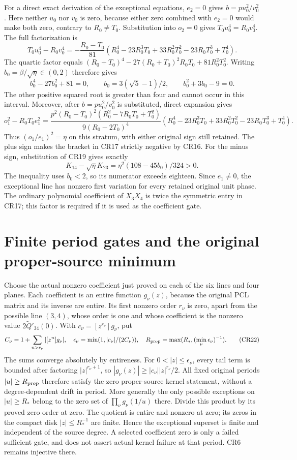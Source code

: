 \documentclass[11pt]{article}
\begin{document}
For a direct exact derivation of the exceptional equations,
$e_2=0$ gives $b=p u_0^2/v_0^2$.  Here neither $u_0$ nor $v_0$
is zero, because either zero combined with $e_2=0$ would make
both zero, contrary to $R_0\ne T_0$.  Substitution into $o_2=0$
gives $T_0u_0^4=R_0v_0^4$.  The full factorization is
\[
 T_0u_0^4-R_0v_0^4
 =-\frac{R_0-T_0}{81}
  (R_0^4-23R_0^3T_0+33R_0^2T_0^2-23R_0T_0^3+T_0^4).           \tag{CR18}
\]
The quartic factor equals
$(R_0+T_0)^4-27(R_0+T_0)^2R_0T_0+81R_0^2T_0^2$.
Writing $b_0=\beta/\sqrt\eta\in(0,2)$ therefore gives
\[
 b_0^4-27b_0^2+81=0,\qquad
 b_0=3(\sqrt5-1)/2,\qquad b_0^2+3b_0-9=0.                     \tag{CR19}
\]
The other positive squared root is greater than four and cannot
occur in this interval.  Moreover, after $b=p u_0^2/v_0^2$
is substituted, direct expansion gives
\[
 o_1^2-R_0T_0e_1^2=
 \frac{p^2(R_0-T_0)^2(R_0^2-7R_0T_0+T_0^2)}{9(R_0-2T_0)^4}
 (R_0^4-23R_0^3T_0+33R_0^2T_0^2-23R_0T_0^3+T_0^4).
                                                                    \tag{CR20}
\]
Thus $(o_1/e_1)^2=\eta$ on this stratum, with either original
sign still retained.  The plus sign makes the bracket in CR17
strictly negative by CR16.  For the minus sign, substitution of
CR19 gives exactly
\[
 K_{14}-\sqrt\eta K_{23}
       =\eta^2(108-45b_0)/324>0.                                \tag{CR21}
\]
The inequality uses $b_0<2$, so its numerator exceeds eighteen.
Since $e_1\ne0$, the exceptional line has nonzero first variation
for every retained original unit phase.  The ordinary polynomial
coefficient of $X_3X_4$ is twice the symmetric entry in CR17;
this factor is required if it is used as the coefficient gate.

\section{Finite period gates and the original proper-source minimum}
Choose the actual nonzero coefficient just proved on each of the
six lines and four planes.  Each coefficient is an entire
function $g_\nu(z)$, because the original PCL matrix and its
inverse are entire.  Its first nonzero order $r_\nu$ is zero,
apart from the possible line $(3,4)$, whose order is one and
whose coefficient is the nonzero value $2\widetilde Q'_{34}(0)$.
With $c_\nu=[z^{r_\nu}]g_\nu$, put
\[
 C_\nu=1+\sum_{n>r_\nu}|[z^n]g_\nu|,\quad
 \epsilon_\nu=\min(1,|c_\nu|/(2C_\nu)),\quad
 R_{\rm prop}=\max(R_*,(\min_\nu\epsilon_\nu)^{-1}).             \tag{CR22}
\]
The sums converge absolutely by entireness.  For
$0<|z|\le\epsilon_\nu$, every tail term is bounded after factoring
$|z|^{r_\nu+1}$, so
$|g_\nu(z)|\ge |c_\nu||z|^{r_\nu}/2$.  All fixed original periods
$|u|\ge R_{\rm prop}$ therefore satisfy the zero proper-source
kernel statement, without a degree-dependent drift in period.
More generally the only possible exceptions on $|u|\ge R_*$
belong to the zero set of $\prod_\nu g_\nu(1/u)$ there.
Divide this product by its proved zero order at zero.  The quotient
is entire and nonzero at zero; its zeros in the compact disk
$|z|\le R_*^{-1}$ are finite.  Hence the exceptional superset is
finite and independent of the source degree.  A selected coefficient
zero is only a failed sufficient gate, and does not assert actual
kernel failure at that period.  CR6 remains injective there.
\end{document}
